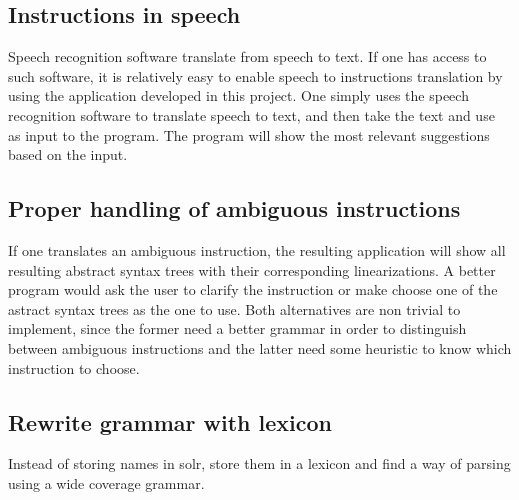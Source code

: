 \subsection*{Instructions in speech}
Speech recognition software translate from speech to text. If one has access to such software, it is relatively easy to enable speech to instructions translation by using the application developed in this project. One simply uses the speech recognition software to translate speech to text, and then take the text and use as input to the program. The program will show the most relevant suggestions based on the input.

\subsection*{Proper handling of ambiguous instructions}
If one translates an ambiguous instruction, the resulting application will show all resulting abstract syntax trees with their corresponding linearizations. A better program would ask the user to clarify the instruction or make choose one of the astract syntax trees as the one to use. Both alternatives are non trivial to implement, since the former need a better grammar in order to distinguish between ambiguous instructions and the latter need some heuristic to know which instruction to choose.

\subsection*{Rewrite grammar with lexicon}
Instead of storing names in solr, store them in a lexicon and find a way of parsing using a wide coverage grammar.